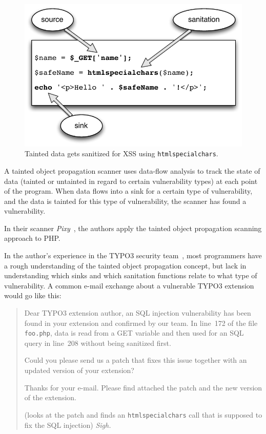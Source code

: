 \begin{figure}[htb]
  \begin{center}
    \includegraphics[scale=0.75]{images/taint-and-clean}
   \caption{Tainted data gets sanitized for XSS using \texttt{htmlspecialchars}.}
   \label{fig:taint-and-clean}
  \end{center}
\end{figure}

A tainted object propagation scanner uses data-flow analysis to track the state of data (tainted or untainted in regard to certain vulnerability types) at each point of the program. When data flows into a sink for a certain type of vulnerability, and the data is tainted for this type of vulnerability, the scanner has found a vulnerability.

In their scanner \emph{Pixy}~\cite{pixy-short, pixy-long, pixy-dissertation}, the authors apply the tainted object propagation scanning approach to PHP.

In the author's experience in the TYPO3 security team~\cite{security-team-members}, most programmers have a rough understanding of the tainted object  propagation concept, but lack in understanding which sinks and which sanitation functions relate to what type of vulnerability. A common e-mail exchange about a vulnerable TYPO3 extension would go like this:

\begin{quote}

 Dear TYPO3 extension author, an SQL injection vulnerability has been found in your extension and confirmed by our team. In line~172 of the file \texttt{foo.php}, data is read from a GET variable and then used for an SQL query in line~208 without being sanitized first.

Could you please send us a patch that fixes this issue together with an updated version of your extension?

 Thanks for your e-mail. Please find attached the patch and the new version of the extension.

 (looks at the patch and finds an \texttt{htmlspecialchars} call that is supposed to fix the SQL injection) \emph{Sigh.}

\end{quote}
